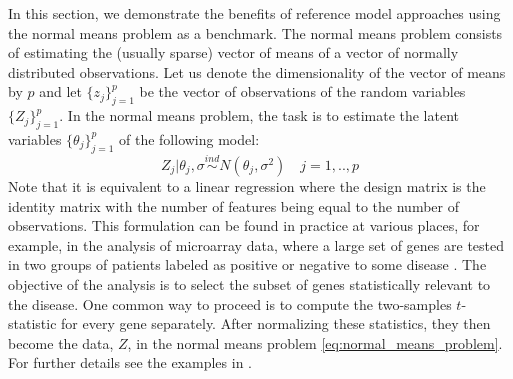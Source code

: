 \documentclass[american,]{article}
\theoremstyle{definition}
\begin{document}
In this section, we demonstrate the benefits of reference model approaches using the normal means problem as a benchmark. The normal means problem consists of estimating the (usually sparse) vector of means of a vector of normally distributed observations. Let us denote the dimensionality of the vector of means by $p$ and let $\{z_{j}\}_{j=1}^{p}$ be the vector of observations of the random variables $\{Z_{j}\}_{j=1}^{p}$. In the normal means problem, the task is to estimate the latent variables $\{\theta_{j}\}_{j=1}^{p}$ of the following model:
\
\begin{equation}\label{eq:normal_means_problem}
Z_{j}|\theta_{j},\sigma\overset{ind}{\sim}N(\theta_{j},\sigma^{2}) \quad j=1,..,p
\end{equation}
Note that it is equivalent to a linear regression where the design matrix is the identity matrix with the number of features being equal to the number of observations. This formulation can be found in practice at various places, 
for example, in the analysis of microarray data, where a large set of genes are tested in two groups of patients labeled as positive or negative to some disease \citep{paper:efron,efron2012large}. The objective of the analysis is to select the subset of genes statistically relevant to the disease. One common way to proceed is to compute the two-samples $t$-statistic for every gene separately.
After normalizing these statistics, they then become the data, $Z$, in the normal means problem \eqref{eq:normal_means_problem}. For further details see the examples in \cite{paper:efron, efron2012large}. 
\end{document}
